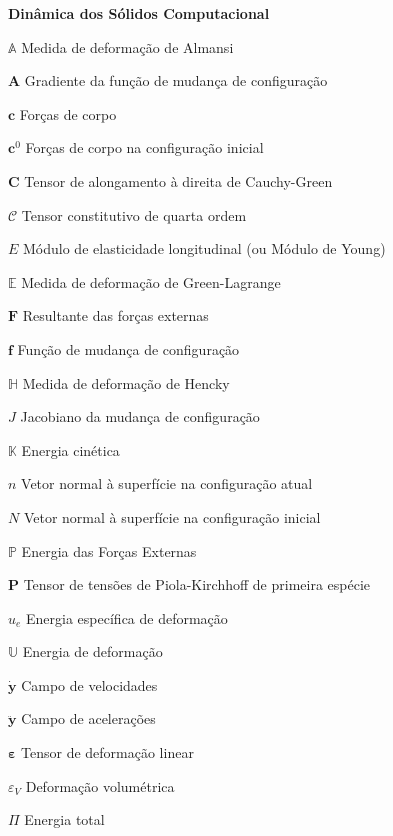 \documentclass[12pt,
	openright,	%
	twoside,    %
	a4paper,			%
	sumario=tradicional,
	english,			%
	french, 			%
	brazil				%
]{USPSC}
\newcommand{\script}[1]{\mathcal{#1}}
\newcommand{\BB}[1]{\mathbf{#1}}
\begin{document}
\begin{simbolos}
    \item[\textbf{Dinâmica dos Sólidos Computacional}]
    \item[$\mathbb{A}$] Medida de deformação de Almansi
    \item[$\BB{A}$] Gradiente da função de mudança de configuração
    \item[$\BB{c}$] Forças de corpo
    \item[$\BB{c}^0$] Forças de corpo na configuração inicial
    \item[$\BB{C}$] Tensor de alongamento à direita de Cauchy-Green
    \item[$\script{C}$] Tensor constitutivo de quarta ordem
    \item[$E$] Módulo de elasticidade longitudinal (ou Módulo de Young)
    \item[$\mathbb{E}$] Medida de deformação de Green-Lagrange
    \item[$\BB{F}$] Resultante das forças externas
    \item[$\BB{f}$] Função de mudança de configuração
    \item[$\mathbb{H}$] Medida de deformação de Hencky
    \item[$J$] Jacobiano da mudança de configuração
    \item[$\mathbb{K}$] Energia cinética
    \item[$n$] Vetor normal à superfície na configuração atual
    \item[$N$] Vetor normal à superfície na configuração inicial
    \item[$\mathbb{P}$] Energia das Forças Externas
    \item[$\BB{P}$] Tensor de tensões de Piola-Kirchhoff de primeira espécie
    \item[$u_e$] Energia específica de deformação
    \item[$\mathbb{U}$] Energia de deformação
    \item[$\dot{\BB{y}}$] Campo de velocidades
    \item[$\ddot{\BB{y}}$] Campo de acelerações
    \item[$\BB{\varepsilon}$] Tensor de deformação linear
    \item[$\varepsilon_V$] Deformação volumétrica
    \item[$\Pi$] Energia total


\end{simbolos}
\end{document}
